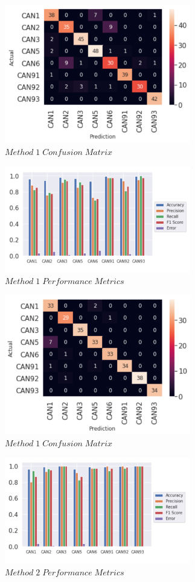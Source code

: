 \documentclass[conference]{IEEEtran}
\begin{document}
\begin{figure}[htb]
\centering
\includegraphics[width=3.2in]{figures/80_m1cm.png}
\caption{$Method\;1\;Confusion\;Matrix$}
\label{fig:M1cm}
\end{figure}

\begin{figure}[htb]
\centering
\includegraphics[width=3.2in]{figures/81_m1pm.png}
\caption{$Method\;1\;Performance\;Metrics$}
\label{fig:M1pm}
\end{figure}

\begin{figure}[htb]
\centering
\includegraphics[width=3.2in]{figures/82_m2cm.png}
\caption{$Method\;1\;Confusion\;Matrix$}
\label{fig:M2cm}
\end{figure}

\begin{figure}[htb]
\centering
\includegraphics[width=3.2in]{figures/83_m2pm.png}
\caption{$Method\;2\;Performance\;Metrics$}
\label{fig:M2pm}
\end{figure}
\end{document}
